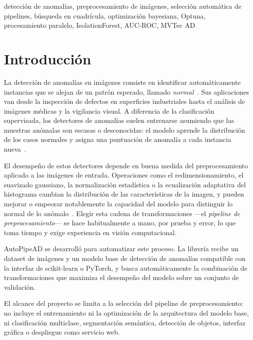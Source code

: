 \documentclass[conference,spanish]{IEEEtran}
\begin{document}
\begin{IEEEkeywords}
detección de anomalías, preprocesamiento de imágenes, selección automática de
pipelines, búsqueda en cuadrícula, optimización bayesiana, Optuna, procesamiento
paralelo, IsolationForest, AUC-ROC, MVTec AD
\end{IEEEkeywords}

\section{Introducción}

La detección de anomalías en imágenes consiste en identificar
automáticamente instancias que se alejan de un patrón esperado, llamado
\emph{normal}~\cite{chandola2009anomaly}. Sus aplicaciones van desde la
inspección de defectos en superficies industriales hasta el análisis de
imágenes médicas y la vigilancia visual. A diferencia de la clasificación
supervisada, los detectores de anomalías suelen entrenarse asumiendo que las
muestras anómalas son escasas o desconocidas: el modelo aprende la
distribución de los casos normales y asigna una puntuación de anomalía a
cada instancia nueva~\cite{chandola2009anomaly}.

El desempeño de estos detectores depende en buena medida del
preprocesamiento aplicado a las imágenes de entrada. Operaciones como el
redimensionamiento, el suavizado gaussiano, la normalización estadística o
la ecualización adaptativa del histograma cambian la distribución de las
características de la imagen, y pueden mejorar o empeorar notablemente la
capacidad del modelo para distinguir lo normal de lo
anómalo~\cite{gonzalez2018dip}. Elegir esta cadena de transformaciones
—el \emph{pipeline de preprocesamiento}— se hace habitualmente a mano, por
prueba y error, lo que toma tiempo y exige experiencia en visión
computacional.

AutoPipeAD se desarrolló para automatizar este proceso. La librería recibe
un dataset de imágenes y un modelo base de detección de anomalías
compatible con la interfaz de scikit-learn o PyTorch, y busca
automáticamente la combinación de transformaciones que maximiza el
desempeño del modelo sobre un conjunto de validación.

El alcance del proyecto se limita a la selección del pipeline de
preprocesamiento: no incluye el entrenamiento ni la optimización de la
arquitectura del modelo base, ni clasificación multiclase, segmentación
semántica, detección de objetos, interfaz gráfica o despliegue como
servicio web.
\end{document}
